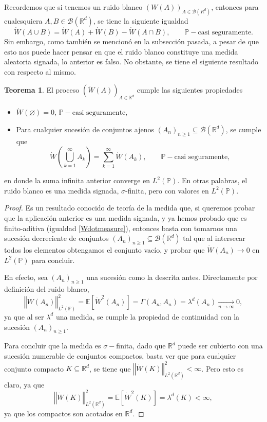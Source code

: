 \documentclass[letterpaper,twoside,12pt]{book}
\newcommand{\R}{\mathbb{R}}
\newcommand{\B}{\mathcal{B}}
\newcommand{\E}{\mathbb{E}}
\renewcommand{\P}{\mathbb{P}}
\newcommand{\W}{\dot{W}}
\newcommand{\1}{\mathds{1}}
\renewcommand{\to}{\rightarrow}
\newcommand{\norm}[1]{\left\Vert #1 \right\Vert}
\theoremstyle{definition}
\theoremstyle{definition}
\newtheorem{teo}{Teorema}
\theoremstyle{remark}
\theoremstyle{definition}
\theoremstyle{definition}
\theoremstyle{definition}
\theoremstyle{definition}
\theoremstyle{definition}
\begin{document}
Recordemos que si tenemos un ruido blanco $(W(A))_{A\in \B(R^{d})}$, entonces para cualesquiera $A,B \in \B(\R^{d})$, se tiene la siguiente igualdad
\[
\W(A\cup B)=\W(A)+\W(B)-\W(A\cap B), \qquad \P-\text{casi seguramente.}   
\]
Sin embargo, como también se mencionó en la subsección pasada, a pesar de que esto nos puede hacer pensar en que el ruido blanco constituye una medida aleatoria signada, lo anterior es falso. No obstante, se tiene el siguiente resultado con respecto al mismo.
\begin{teo}\label{Finito_aditiv_ruido_blanco}
 El proceso $(\W(A))_{A\in \R^{d}}$ cumple las siguientes propiedades
 \begin{itemize}
    \item $\W(\varnothing)=0$, \qquad $\P-\text{casi seguramente,}$
    \item Para cualquier sucesión de conjuntos ajenos $(A_n)_{n\geq 1}\subseteq \B(\R^d)$, se cumple que 
    \[
    \W \left(\bigcup_{k=1}^\infty A_k\right)=\sum_{k=1}^{\infty}\W(A_k), \qquad \P-\text{casi seguramente,} 
    \]
 \end{itemize}
 en donde la suma infinita anterior converge en $L^2(\P)$. En otras palabras, el 
 ruido blanco es una medida signada, $\sigma$-finita, pero con valores en $L^2(\P)$.
\end{teo}
\begin{proof} 
   Es un resultado conocido de teoría de la medida que, si queremos probar que la aplicación anterior es una medida signada, y ya hemos probado que es finito-aditiva (igualdad \eqref{Wdotmeasure}), entonces basta con tomarnos una sucesión decreciente de conjuntos $(A_n)_{n\geq1}\subseteq\B(\R^{d})$ tal que al intersecar todos los elementos obtengamos el conjunto vacío, y probar que $\W(A_n)\to 0$ en $L^{2}(\P)$ para concluir.

   En efecto, sea $(A_n)_{n\geq1}$ una sucesión como la descrita antes. Directamente por definición del ruido blanco, 
   \[
   \norm{\W(A_n)}_{L^2(\P)}^2=\E\left[\W^2(A_n)\right]=\Gamma(A_n,A_n)=\lambda^{d}(A_n)\xrightarrow[n\to\infty]{}0,    
   \]
   ya que al ser $\lambda^d$ una medida, se cumple la propiedad de continuidad con la sucesión $(A_n)_{n\geq1}$.

   Para concluir que la medida es $\sigma-$finita, dado que $\R^{d}$ puede ser cubierto con una sucesión numerable de conjuntos compactos, basta ver que para cualquier conjunto compacto $K\subseteq\R^{d}$, se tiene que $\norm{\W(K)}_{L^ {2}(\R^{d})}^2<\infty$. Pero esto es claro, ya que 
   \[
       \norm{\W(K)}_{L^ {2}(\R^{d})}^2=\E\left[\W^2(K)\right]=\lambda^{d}(K)<\infty,
   \]
   ya que los compactos son acotados en $\R^{d}$.
 \end{proof}  
\end{document}
